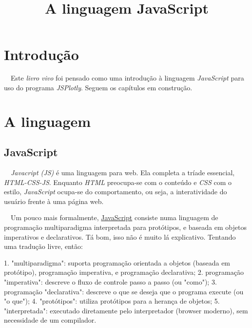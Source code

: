 \documentclass[
  portuguese,
  letterpaper,
  DIV=11,
  numbers=noendperiod]{scrreprt}
\title{A linguagem JavaScript}
\author{}
\date{}
\newenvironment{Shaded}{\begin{snugshade}}{\end{snugshade}}
\newcommand{\FloatTok}[1]{\textcolor[rgb]{0.68,0.00,0.00}{#1}}
\newcommand{\FunctionTok}[1]{\textcolor[rgb]{0.28,0.35,0.67}{#1}}
\newcommand{\NormalTok}[1]{\textcolor[rgb]{0.00,0.23,0.31}{#1}}
\newcommand{\SpecialCharTok}[1]{\textcolor[rgb]{0.37,0.37,0.37}{#1}}
\newcommand{\StringTok}[1]{\textcolor[rgb]{0.13,0.47,0.30}{#1}}
\renewcommand*\contentsname{Índice}
\newcommand\contentsname{Índice}
\begin{document}
\maketitle

\renewcommand*\contentsname{Índice}
{
\hypersetup{linkcolor=}
\setcounter{tocdepth}{2}
\tableofcontents
}


\chapter{Introdução}\label{introduuxe7uxe3o}

~~Este \emph{livro vivo} foi pensado como uma introdução à linguagem
\emph{JavaScript} para uso do programa \emph{JSPlotly}. Seguem os
capítulos em construção.


\chapter{A linguagem}\label{a-linguagem}

\section{JavaScript}\label{javascript}

~~\emph{Javacript (JS)} é uma linguagem para web. Ela completa a tríade
essencial, \emph{HTML-CSS-JS}. Enquanto \emph{HTML} preocupa-se com o
conteúdo e \emph{CSS} com o estilo, \emph{JavaScript} ocupa-se do
comportamento, ou seja, a interatividade do usuário frente à uma página
web.

~~Um pouco mais formalmente,
\href{https://developer.mozilla.org/pt-BR/docs/Web/JavaScript}{JavaScript}
consiste numa linguagem de programação multiparadigma interpretada para
protótipos, e baseada em objetos imperativos e declarativos. Tá bom,
isso não é muito lá explicativo. Tentando uma tradução livre, então:

\begin{Shaded}
\begin{Highlighting}[]
\FloatTok{1.} \StringTok{"multiparadigma"}\SpecialCharTok{:}\NormalTok{ suporta programação orientada a }\FunctionTok{objetos}\NormalTok{ (baseada em protótipo), programação imperativa, e programação declarativa;}
\FloatTok{2.}\NormalTok{ programação }\StringTok{"imperativa"}\SpecialCharTok{:}\NormalTok{ descreve o fluxo de controle passo a }\FunctionTok{passo}\NormalTok{ (ou }\StringTok{"como"}\NormalTok{);}
\FloatTok{3.}\NormalTok{ programação }\StringTok{"declarativa"}\SpecialCharTok{:}\NormalTok{ descreve o que se deseja que o programa }\FunctionTok{execute}\NormalTok{ (ou }\StringTok{"o que"}\NormalTok{);}
\FloatTok{4.} \StringTok{"protótipos"}\SpecialCharTok{:}\NormalTok{ utiliza protótipos para a herança de objetos;}
\FloatTok{5.} \StringTok{"interpretada"}\SpecialCharTok{:}\NormalTok{ executado diretamente pelo }\FunctionTok{interpretador}\NormalTok{ (browser moderno), sem necessidade de um compilador.}
\end{Highlighting}
\end{Shaded}
\end{document}
